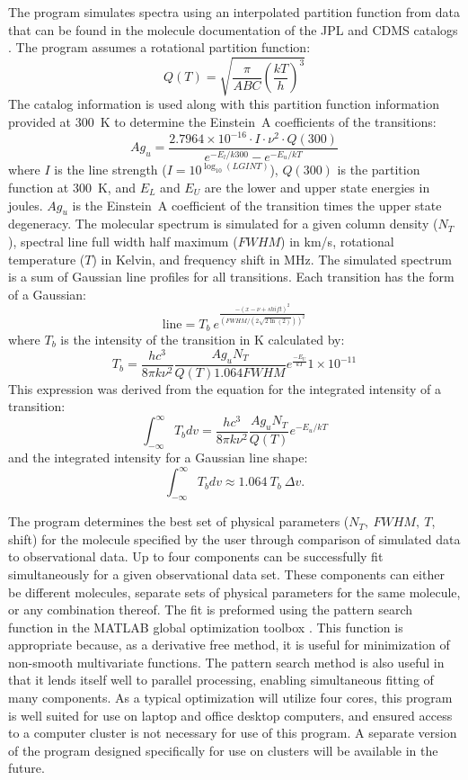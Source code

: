 The program simulates spectra using an interpolated partition function from data that can be found in the molecule documentation of the JPL and CDMS catalogs \citep{Pickett_1998, Muller_2005}.  The program assumes a rotational partition function:
$$Q(T) = \sqrt{\frac{\pi}{ABC}\left(\frac{k T}{h}\right)^3}$$
The catalog information is used along with this partition function information provided at 300~K to determine the Einstein~A coefficients of the transitions:
$$Ag_u = \frac{2.7964\times10^{-16}\cdot I \cdot \nu^2 \cdot Q(300)}{e^{-E_l/k300}- e^{-E_u/kT}}$$
where $I$ is the line strength ($I = 10^{\log_{10}(LGINT)}$), $Q(300)$ is the partition function at 300~K, and $E_L$ and $E_U$ are the lower and upper state energies in joules.  $Ag_u$ is the Einstein~A coefficient of the transition times the upper state degeneracy.  The molecular spectrum is simulated for a given column density ($N_T$), spectral line full width half maximum ($FWHM$) in km/s, rotational temperature ($T$) in Kelvin, and frequency shift in MHz.  The simulated spectrum is a sum of Gaussian line profiles for all transitions.  Each transition has the form of a Gaussian:
$$\text{line} = T_b~e^{\frac{-(x - \nu + shift)^2}{\left(FWHM/\left(2\sqrt{2\ln(2)}\right)\right)^2}}$$
where $T_b$ is the intensity of the transition in K calculated by:
$$T_b = \frac{h c^3}{8\pi k\nu^2}\frac{Ag_u N_T}{Q(T) 1.064 FWHM}e^{\frac{-E_U}{k T}}1\times 10^{-11}$$
This expression was derived from the equation for the integrated intensity of a transition:
$$\int_{-\infty}^{\infty}T_b dv = \frac{h c^3}{8\pi k\nu^2}\frac{Ag_u N_T}{Q(T)}e^{-E_u/k T}$$
\citep{NummelinApJS_1998} and the integrated intensity for a Gaussian line shape:
$$\int_{-\infty}^{\infty}T_b dv \approx 1.064~T_b~\Delta v.$$

The program determines the best set of physical parameters ($N_T,~FWHM,~T$, shift) for the molecule specified by the user through comparison of simulated data to observational data.  Up to four components can be successfully fit simultaneously for a given observational data set.  These components can either be different molecules, separate sets of physical parameters for the same molecule, or any combination thereof.  The fit is preformed using the pattern search function in the MATLAB global optimization toolbox \citep{MATLAB}.  This function is appropriate because, as a derivative free method, it is useful for minimization of non-smooth multivariate functions.  The pattern search method is also useful in that it lends itself well to parallel processing, enabling simultaneous fitting of many components.  As a typical optimization will utilize four cores, this program is well suited for use on laptop and office desktop computers, and ensured access to a computer cluster is not necessary for use of this program.  A separate version of the program designed specifically for use on clusters will be available in the future.

